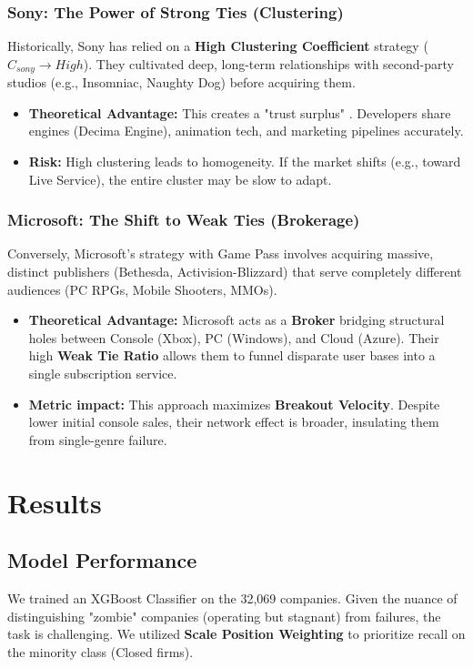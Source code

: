 \documentclass[11pt, a4paper]{article}
\begin{document}
\subsubsection{Sony: The Power of Strong Ties (Clustering)}
Historically, Sony has relied on a \textbf{High Clustering Coefficient} strategy ($C_{sony} \to High$). They cultivated deep, long-term relationships with second-party studios (e.g., Insomniac, Naughty Dog) before acquiring them.
\begin{itemize}
    \item \textbf{Theoretical Advantage:} This creates a "trust surplus" \citep{coleman1988}. Developers share engines (Decima Engine), animation tech, and marketing pipelines accurately.
    \item \textbf{Risk:} High clustering leads to homogeneity. If the market shifts (e.g., toward Live Service), the entire cluster may be slow to adapt.
\end{itemize}

\subsubsection{Microsoft: The Shift to Weak Ties (Brokerage)}
Conversely, Microsoft's strategy with Game Pass involves acquiring massive, distinct publishers (Bethesda, Activision-Blizzard) that serve completely different audiences (PC RPGs, Mobile Shooters, MMOs).
\begin{itemize}
    \item \textbf{Theoretical Advantage:} Microsoft acts as a \textbf{Broker} bridging structural holes between Console (Xbox), PC (Windows), and Cloud (Azure). Their high \textbf{Weak Tie Ratio} allows them to funnel disparate user bases into a single subscription service.
    \item \textbf{Metric impact:} This approach maximizes \textbf{Breakout Velocity}. Despite lower initial console sales, their network effect is broader, insulating them from single-genre failure.
\end{itemize}

\section{Results}

\subsection{Model Performance}
We trained an XGBoost Classifier on the 32,069 companies. Given the nuance of distinguishing "zombie" companies (operating but stagnant) from failures, the task is challenging. We utilized \textbf{Scale Position Weighting} to prioritize recall on the minority class (Closed firms).
\end{document}
